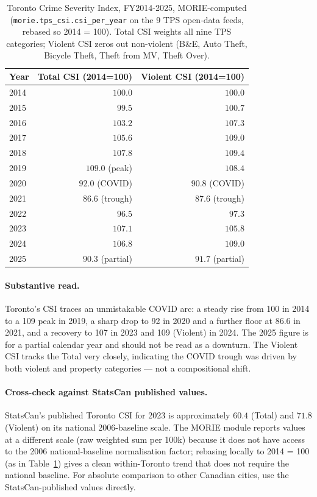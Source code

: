 \documentclass[article,shortnames,nojss]{jss}
\begin{document}
\begin{table}[h]
\centering\footnotesize
\caption{Toronto Crime Severity Index, FY2014-2025, MORIE-computed
(\texttt{morie.tps\_csi.csi\_per\_year} on the 9 TPS open-data
feeds, rebased so 2014 = 100).  Total CSI weights all nine TPS
categories; Violent CSI zeros out non-violent (B\&E, Auto Theft,
Bicycle Theft, Theft from MV, Theft Over).
}\label{tab:csi-toronto}
\begin{tabular}{lrr}
\toprule
Year & Total CSI (2014=100) & Violent CSI (2014=100)\\\midrule
2014 & $100.0$ & $100.0$\\
2015 & $\phantom{0}99.5$ & $100.7$\\
2016 & $103.2$ & $107.3$\\
2017 & $105.6$ & $109.0$\\
2018 & $107.8$ & $109.4$\\
2019 & $\mathbf{109.0}$ (peak) & $108.4$\\
2020 & $\phantom{0}92.0$ (COVID) & $\phantom{0}90.8$ (COVID)\\
2021 & $\phantom{0}86.6$ (trough) & $\phantom{0}87.6$ (trough)\\
2022 & $\phantom{0}96.5$ & $\phantom{0}97.3$\\
2023 & $107.1$ & $105.8$\\
2024 & $106.8$ & $\mathbf{109.0}$\\
2025 & $\phantom{0}90.3$ (partial) & $\phantom{0}91.7$ (partial)\\
\bottomrule
\end{tabular}
\end{table}

\paragraph{Substantive read.}  Toronto's CSI traces an unmistakable
COVID arc: a steady rise from 100 in 2014 to a 109 peak in 2019,
a sharp drop to 92 in 2020 and a further floor at 86.6 in 2021,
and a recovery to 107 in 2023 and 109 (Violent) in 2024.  The
2025 figure is for a partial calendar year and should not be
read as a downturn.  The Violent CSI tracks the Total very
closely, indicating the COVID trough was driven by both violent
and property categories — not a compositional shift.

\paragraph{Cross-check against StatsCan published values.}
StatsCan's published Toronto CSI for 2023 is approximately $60.4$
(Total) and $71.8$ (Violent) on its national 2006-baseline scale.
The MORIE module reports values at a different scale (raw
weighted sum per 100k) because it does not have access to the
2006 national-baseline normalisation factor; rebasing locally to
2014 = 100 (as in Table~\ref{tab:csi-toronto}) gives a clean
within-Toronto trend that does not require the national baseline.
For absolute comparison to other Canadian cities, use the
StatsCan-published values directly.
\end{document}
